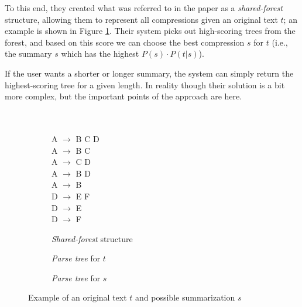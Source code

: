 To this end, they created what was referred to in the paper as a \textit{shared-forest} structure, allowing them to represent all compressions given an original text $t$; an example is shown in Figure \ref{fig:statistics_example}. Their system picks out high-scoring trees from the forest, and based on this score we can choose the best compression $s$ for $t$ (i.e., the summary $s$ which has the highest $P(s) \cdot P(t \vert s)$).

If the user wants a shorter or longer summary, the system can simply return the highest-scoring tree for a given length. In reality though their solution is a bit more complex, but the important points of the approach are here.

\begin{figure}[H]
\begin{subfigure}{0.3\textwidth}
\quad \\
\quad \\
\phantom{\qquad}A $\rightarrow$ B C D \\
\phantom{\qquad}A $\rightarrow$ B C \\
\phantom{\qquad}A $\rightarrow$ C D \\
\phantom{\qquad}A $\rightarrow$ B D \\
\phantom{\qquad}A $\rightarrow$ B \\
\phantom{\qquad}D $\rightarrow$ E F \\
\phantom{\qquad}D $\rightarrow$ E \\
\phantom{\qquad}D $\rightarrow$ F \\
\caption{\textit{Shared-forest} structure}
\end{subfigure}
\begin{subfigure}{0.4\textwidth}
\centering
{}
\caption{\textit{Parse tree} for $t$}
\end{subfigure}
\begin{subfigure}{0.25\textwidth}
\centering
{}
\caption{\textit{Parse tree} for $s$}
\end{subfigure}
\caption{Example of an original text $t$ and possible summarization $s$}
\label{fig:statistics_example}
\end{figure}


